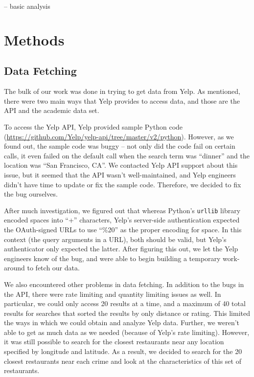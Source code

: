 \documentclass{article}
\begin{document}
-- basic analysis

\section{Methods}

\subsection{Data Fetching}

The bulk of our work was done in trying to get data from Yelp. As
mentioned, there were two main ways that Yelp provides to access data, and
those are the API and the academic data set.

To access the Yelp API, Yelp provided sample Python code
(\url{https://github.com/Yelp/yelp-api/tree/master/v2/python}). However, as
we found out, the sample code was buggy -- not only did the code fail on
certain calls, it even failed on the default call when the search term was
``dinner'' and the location was ``San Francisco, CA''. We contacted Yelp
API support about this issue, but it seemed that the API wasn't
well-maintained, and Yelp engineers didn't have time to update or fix the
sample code. Therefore, we decided to fix the bug ourselves.

After much investigation, we figured out that whereas Python's
\texttt{urllib} library encoded spaces into ``+'' characters, Yelp's
server-side authentication expected the OAuth-signed URLs to use ``\%20''
as the proper encoding for space. In this context (the query arguments in a
URL), both should be valid, but Yelp's authenticator only expected the
latter. After figuring this out, we let the Yelp engineers know of the bug,
and were able to begin building a temporary work-around to fetch our data.

We also encountered other problems in data fetching. In addition to the
bugs in the API, there were rate limiting and quantity limiting issues as
well. In particular, we could only access 20 results at a time, and a
maximum of 40 total results for searches that sorted the results by only
distance or rating. This limited the ways in which we could obtain and
analyze Yelp data.
Further, we weren't able to get as much data as we needed (because of
Yelp's rate limiting). However, it was still possible to search for the
closest restaurants near any location specified by longitude and
latitude. As a result, we decided to search for the 20 closest restaurants
near each crime and look at the characteristics of this set of restaurants.
\end{document}
